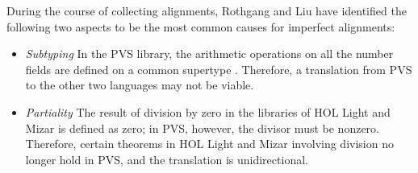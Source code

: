 


During the course of collecting alignments, Rothgang and Liu have identified the following two aspects to be the most common causes for imperfect alignments:
\begin{itemize}
\item \emph{Subtyping} In the PVS library, the arithmetic operations on all the number fields are defined on a common supertype . Therefore, a translation from PVS to the other two languages may not be viable. 
\item \emph{Partiality} The result of division by zero in the libraries of HOL Light and Mizar is defined as zero; in PVS, however, the divisor must be nonzero. Therefore, certain theorems in HOL Light and Mizar involving division no longer hold in PVS, and the translation is unidirectional. %
\end{itemize}




